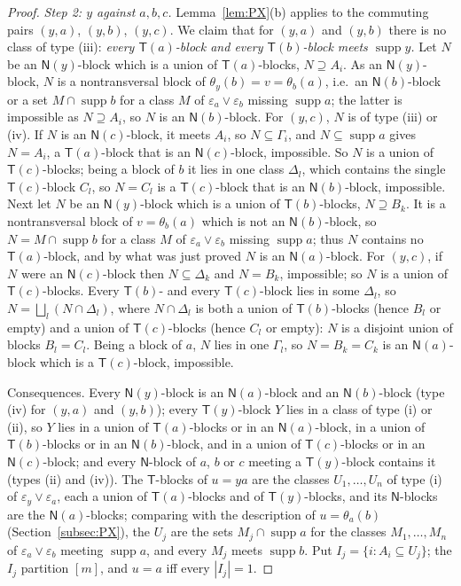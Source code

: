 \documentclass[11pt]{amsart}
\theoremstyle{definition}
\newcommand{\supp}{\operatorname{supp}}
\newcommand{\T}{\mathsf{T}}
\newcommand{\N}{\mathsf{N}}
\begin{document}
\begin{proof}
\smallskip\emph{Step 2: $y$ against $a,b,c$.} Lemma~\ref{lem:PX}(b) applies to the commuting pairs $(y,a)$, $(y,b)$, $(y,c)$. We claim that for $(y,a)$ and $(y,b)$ there is no class of type (iii): \emph{every $\T(a)$-block and every $\T(b)$-block meets $\supp y$.} Let $N$ be an $\N(y)$-block which is a union of $\T(a)$-blocks, $N\supseteq A_i$. As an $\N(y)$-block, $N$ is a nontransversal block of $\theta_y(b)=v=\theta_b(a)$, i.e.\ an $\N(b)$-block or a set $M\cap\supp b$ for a class $M$ of $\varepsilon_a\vee\varepsilon_b$ missing $\supp a$; the latter is impossible as $N\supseteq A_i$, so $N$ is an $\N(b)$-block. For $(y,c)$, $N$ is of type (iii) or (iv). If $N$ is an $\N(c)$-block, it meets $A_i$, so $N\subseteq\Gamma_i$, and $N\subseteq\supp a$ gives $N=A_i$, a $\T(a)$-block that is an $\N(c)$-block, impossible. So $N$ is a union of $\T(c)$-blocks; being a block of $b$ it lies in one class $\Delta_l$, which contains the single $\T(c)$-block $C_l$, so $N=C_l$ is a $\T(c)$-block that is an $\N(b)$-block, impossible. Next let $N$ be an $\N(y)$-block which is a union of $\T(b)$-blocks, $N\supseteq B_k$. It is a nontransversal block of $v=\theta_b(a)$ which is not an $\N(b)$-block, so $N=M\cap\supp b$ for a class $M$ of $\varepsilon_a\vee\varepsilon_b$ missing $\supp a$; thus $N$ contains no $\T(a)$-block, and by what was just proved $N$ is an $\N(a)$-block. For $(y,c)$, if $N$ were an $\N(c)$-block then $N\subseteq\Delta_k$ and $N=B_k$, impossible; so $N$ is a union of $\T(c)$-blocks. Every $\T(b)$- and every $\T(c)$-block lies in some $\Delta_l$, so $N=\bigsqcup_l(N\cap\Delta_l)$, where $N\cap\Delta_l$ is both a union of $\T(b)$-blocks (hence $B_l$ or empty) and a union of $\T(c)$-blocks (hence $C_l$ or empty): $N$ is a disjoint union of blocks $B_l=C_l$. Being a block of $a$, $N$ lies in one $\Gamma_l$, so $N=B_k=C_k$ is an $\N(a)$-block which is a $\T(c)$-block, impossible.

Consequences. Every $\N(y)$-block is an $\N(a)$-block and an $\N(b)$-block (type (iv) for $(y,a)$ and $(y,b)$); every $\T(y)$-block $Y$ lies in a class of type (i) or (ii), so $Y$ lies in a union of $\T(a)$-blocks or in an $\N(a)$-block, in a union of $\T(b)$-blocks or in an $\N(b)$-block, and in a union of $\T(c)$-blocks or in an $\N(c)$-block; and every $\N$-block of $a$, $b$ or $c$ meeting a $\T(y)$-block contains it (types (ii) and (iv)). The $\T$-blocks of $u=ya$ are the classes $U_1,\dots,U_n$ of type (i) of $\varepsilon_y\vee\varepsilon_a$, each a union of $\T(a)$-blocks and of $\T(y)$-blocks, and its $\N$-blocks are the $\N(a)$-blocks; comparing with the description of $u=\theta_a(b)$ (Section~\ref{subsec:PX}), the $U_j$ are the sets $M_j\cap\supp a$ for the classes $M_1,\dots,M_n$ of $\varepsilon_a\vee\varepsilon_b$ meeting $\supp a$, and every $M_j$ meets $\supp b$. Put $I_j=\{i:A_i\subseteq U_j\}$; the $I_j$ partition $[m]$, and $u=a$ iff every $|I_j|=1$.


\end{proof}
\end{document}
